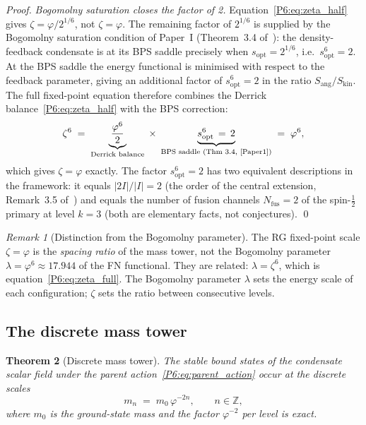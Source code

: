 \documentclass[11pt,a4paper]{article}
\newtheorem{theorem}{Theorem}[section]
\theoremstyle{definition}
\theoremstyle{remark}
\newtheorem{remark}[theorem]{Remark}
\newcommand{\vp}{\varphi}
\newcommand{\lam}{\lambda}
\newcommand{\sopt}{s_{\mathrm{opt}}}
\begin{document}
\begin{proof}
\emph{Bogomolny saturation closes the factor of 2.}
Equation~\eqref{P6:eq:zeta_half} gives $\zeta = \vp/2^{1/6}$, not $\zeta=\vp$.
The remaining factor of $2^{1/6}$ is supplied by the Bogomolny saturation
condition of Paper~I (Theorem~3.4 of~\cite{Paper1}): the density-feedback
condensate is at its BPS saddle precisely when $\sopt = 2^{1/6}$,
i.e.\ $\sopt^6 = 2$.
At the BPS saddle the energy functional is minimised with respect to the
feedback parameter, giving an additional factor of $\sopt^6 = 2$ in the
ratio $S_{\mathrm{ang}}/S_{\mathrm{kin}}$.
The full fixed-point equation therefore combines the Derrick
balance~\eqref{P6:eq:zeta_half} with the BPS correction:
\begin{equation}
  \zeta^6
  \;=\; \underbrace{\frac{\vp^6}{2}}_{\text{Derrick balance}}
  \;\times\; \underbrace{\sopt^6\,=\,2}_{\text{BPS saddle (Thm~3.4,~\cite{Paper1})}}
  \;=\; \vp^6,
  \label{P6:eq:zeta_full}
\end{equation}
which gives $\zeta = \vp$ exactly.
The factor $\sopt^6 = 2$ has two equivalent descriptions in the framework:
it equals $|2I|/|I| = 2$ (the order of the central extension,
Remark~3.5 of~\cite{Paper1}) and equals the number of fusion channels
$N_{\mathrm{fus}} = 2$ of the spin-$\tfrac{1}{2}$ primary at level $k=3$
(both are elementary facts, not conjectures).
\qed
\end{proof}

\begin{remark}[Distinction from the Bogomolny parameter]
The RG fixed-point scale $\zeta = \vp$ is the \emph{spacing ratio}
of the mass tower, not the Bogomolny parameter $\lam = \vp^6 \approx 17.944$
of the FN functional.  They are related: $\lam = \zeta^6$, which is
equation~\eqref{P6:eq:zeta_full}.  The Bogomolny parameter $\lam$
sets the energy scale of each configuration; $\zeta$ sets the ratio
between consecutive levels.
\end{remark}

\subsection{The discrete mass tower}

\begin{theorem}[Discrete mass tower]
\label{P6:thm:tower_quantisation}
The stable bound states of the condensate scalar field under the
parent action~\eqref{P6:eq:parent_action} occur at the discrete
scales
\begin{equation}
  m_n \;=\; m_0\,\vp^{-2n}, \qquad n \in \mathbb{Z},
  \label{P6:eq:mass_tower}
\end{equation}
where $m_0$ is the ground-state mass and the factor $\vp^{-2}$ per
level is exact.
\end{theorem}
\end{document}
